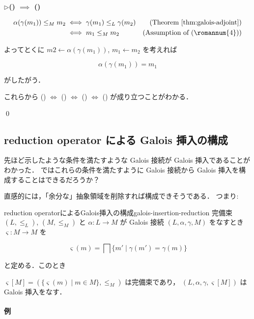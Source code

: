 \documentclass[uplatex]{jsarticle}
\newenvironment{proofpart}[1]
  {\par\vspace{1em}\noindent\hspace{10pt}$\triangleright$\hspace{5pt}\textbf{#1}\\[0.3em]
   \hspace{10pt}\begin{tcolorbox}[enhanced,
     left=20pt, right=0pt, top=3pt, bottom=3pt,
     colback=white,
     colframe=white,
     leftrule=0.3pt,
     rightrule=0pt,
     toprule=0pt,
     bottomrule=0pt,
     sharp corners,
     boxsep=0pt,
     before skip=0pt,
     after skip=1em
   ]}
  {\end{tcolorbox}}
\begin{document}
\begin{proofpart}{() $\implies$ ()}

  \begin{align*}
    \alpha(\gamma(m_1)) \leq_M m_2
     & \iff \gamma(m_1) \leq_L \gamma(m_2) & \text{(Theorem \ref{thm:galois-adjoint})} \\
     & \iff m_1 \leq_M m_2                 & \text{(Assumption of (\romannum{4}))}
  \end{align*}

  よってとくに $m2 \leftarrow \alpha(\gamma(m_1))$, $m_1 \leftarrow m_2$ を考えれば

  $$
    \alpha(\gamma(m_1)) = m_1
  $$

  がしたがう．

\end{proofpart}

これらから () $\iff$ () $\iff$ () $\iff$ () が成り立つことがわかる．


\qed

\subsection{reduction operator による Galois 挿入の構成}

先ほど示したような条件を満たすような Galois 接続が Galois 挿入であることがわかった．
ではこれらの条件を満たすように Galois 接続から Galois 挿入を構成することはできるだろうか？

直感的には，「余分な」抽象領域を削除すれば構成できそうである．
つまり:

\begin{boxproposition}{reduction operatorによるGalois挿入の構成}{galois-insertion-reduction}
  完備束 $(L, \leq_L)$, $(M, \leq_M)$ と $\alpha: L \to M$ が Galois 接続 $(L, \alpha, \gamma, M)$ をなすとき
  $\varsigma: M \to M$ を

  $$
    \varsigma(m) = \bigsqcap \{m' \mid \gamma(m') = \gamma(m)\}
  $$

  と定める．このとき

  $\varsigma [ M ] = (\{ \varsigma(m) \mid m \in M \}, \leq_M)$ は完備束であり，
  $(L, \alpha, \gamma, \varsigma [ M ])$ は Galois 挿入をなす．
\end{boxproposition}


\paragraph*{例}
\end{document}

